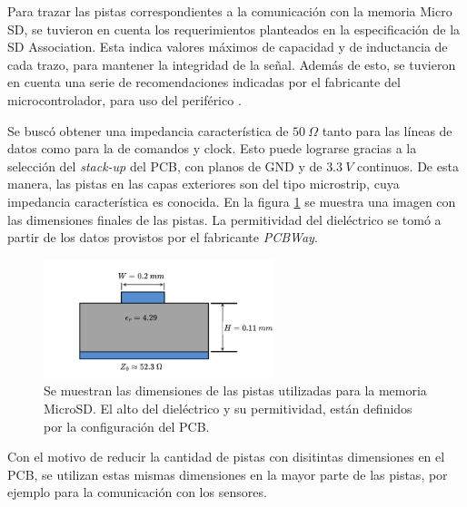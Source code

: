 Para trazar las pistas correspondientes a la comunicación con la memoria Micro SD, se tuvieron en cuenta los requerimientos planteados en la especificación de la SD Association. Esta indica valores máximos de capacidad y de inductancia de cada trazo, para mantener la integridad de la señal. Además de esto, se tuvieron en cuenta una serie de recomendaciones indicadas por el fabricante del microcontrolador, para uso del periférico \cite{AN4661}.


Se buscó obtener una impedancia característica de $50 \ \Omega$ tanto para las líneas de datos como para la de comandos y clock. Esto puede lograrse gracias a la selección del \textit{stack-up} del PCB, con planos de GND y de $3.3 \ V$ continuos. De esta manera, las pistas en las capas exteriores son del tipo microstrip, cuya impedancia característica es conocida. En la figura \ref{fig:microstrip} se muestra una imagen con las dimensiones finales de las pistas. La permitividad del dieléctrico se tomó a partir de los datos provistos por el fabricante \textit{PCBWay}.

\begin{figure}[H]
    \centering
    \includegraphics[width=0.6\textwidth]{img/microstrip_2.png}
    \caption{Se muestran las dimensiones de las pistas utilizadas para la memoria MicroSD. El alto del dieléctrico y su permitividad, están definidos por la configuración del PCB.}
    \label{fig:microstrip}
\end{figure}

Con el motivo de reducir la cantidad de pistas con disitintas dimensiones en el PCB, se utilizan estas mismas dimensiones en la mayor parte de las pistas, por ejemplo para la comunicación con los sensores.




